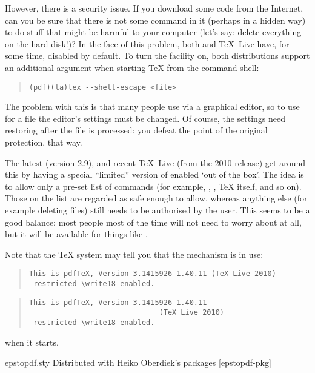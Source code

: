 However, there is a security issue. If you download some \alltex{} code from
the Internet, can you be sure that there is not some command in it
(perhaps in a hidden way) to do stuff that might be harmful to your
computer (let's say: delete everything on the hard disk!)?  In the
face of this problem, both \miktex{} and \TeX{}~Live have, for some
time, disabled  by default.  To turn the facility on,
both distributions support an additional argument when starting \TeX{}
from the command shell:
\begin{quote}
\begin{verbatim}
(pdf)(la)tex --shell-escape <file>
\end{verbatim}
\end{quote}
The problem with this is that many people use \alltex{} via a graphical
editor, so to use  for a file the editor's settings must
be changed.  Of course, the settings need restoring after the file is
processed: you defeat the point of the original protection, that way.

The latest \miktex{} (version 2.9), and recent \TeX{}~Live (from the
2010 release) get
around this by having a special ``limited'' version of 
enabled `out of the box'.  The idea is to allow only a pre-set list of
commands (for example, \BibTeX{}, , \TeX{} itself,
and so on).  Those on the list are regarded as safe enough to allow,
whereas anything else (for example deleting files) still needs to be
authorised by the user. This seems to be a good balance: most people
most of the time will not need to worry about  at all,
but it will be available for things like .

Note that the \TeX{} system may tell you that the mechanism is in use:
\begin{wideversion}
\begin{quote}
\begin{verbatim}
This is pdfTeX, Version 3.1415926-1.40.11 (TeX Live 2010)
 restricted \write18 enabled.
\end{verbatim}
\end{quote}
\end{wideversion}
\begin{narrowversion}
\begin{quote}
\begin{verbatim}
This is pdfTeX, Version 3.1415926-1.40.11
                              (TeX Live 2010)
 restricted \write18 enabled.
\end{verbatim}
\end{quote}
\end{narrowversion}
when it starts.
\begin{ctanrefs}
\item[epstopdf.sty]Distributed with Heiko Oberdiek's packages
  [epstopdf-pkg]
\end{ctanrefs}

